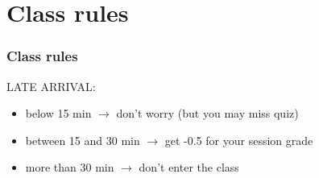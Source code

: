 \documentclass[15pt]{beamer}
\begin{document}
\section{Class rules}
\begin{frame}
    \frametitle{Class rules}

    LATE ARRIVAL:
    \begin{itemize}
        \item below 15 min $\rightarrow$ don’t worry (but you may miss quiz)
        \item {\color{orange} between 15 and 30 min $\rightarrow$ get -0.5 for your session grade}
        \item {\color{red} more than 30 min $\rightarrow$ don’t enter the class}
    \end{itemize}

\end{frame}
\end{document}

